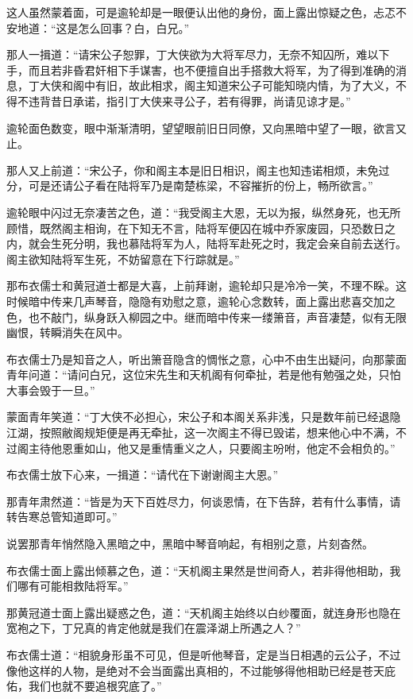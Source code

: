 这人虽然蒙着面，可是逾轮却是一眼便认出他的身份，面上露出惊疑之色，忐忑不安地道：“这是怎么回事？白，白兄。”

那人一揖道：“请宋公子恕罪，丁大侠欲为大将军尽力，无奈不知囚所，难以下手，而且若非昏君奸相下手谋害，也不便擅自出手搭救大将军，为了得到准确的消息，丁大侠和阁中有旧，故此相求，阁主知道宋公子可能知晓内情，为了大义，不得不违背昔日承诺，指引丁大侠来寻公子，若有得罪，尚请见谅才是。”

逾轮面色数变，眼中渐渐清明，望望眼前旧日同僚，又向黑暗中望了一眼，欲言又止。

那人又上前道：“宋公子，你和阁主本是旧日相识，阁主也知违诺相烦，未免过分，可是还请公子看在陆将军乃是南楚栋梁，不容摧折的份上，畅所欲言。”

逾轮眼中闪过无奈凄苦之色，道：“我受阁主大恩，无以为报，纵然身死，也无所顾惜，既然阁主相询，在下知无不言，陆将军便囚在城中乔家废园，只恐数日之内，就会生死分明，我也慕陆将军为人，陆将军赴死之时，我定会亲自前去送行。阁主欲知陆将军生死，不妨留意在下行踪就是。”

那布衣儒士和黄冠道士都是大喜，上前拜谢，逾轮却只是冷冷一笑，不理不睬。这时候暗中传来几声琴音，隐隐有劝慰之意，逾轮心念数转，面上露出悲喜交加之色，也不敲门，纵身跃入柳园之中。继而暗中传来一缕箫音，声音凄楚，似有无限幽恨，转瞬消失在风中。

布衣儒士乃是知音之人，听出箫音隐含的惆怅之意，心中不由生出疑问，向那蒙面青年问道：“请问白兄，这位宋先生和天机阁有何牵扯，若是他有勉强之处，只怕大事会毁于一旦。”

蒙面青年笑道：“丁大侠不必担心，宋公子和本阁关系非浅，只是数年前已经退隐江湖，按照敝阁规矩便是再无牵扯，这一次阁主不得已毁诺，想来他心中不满，不过阁主待他恩重如山，他又是重情重义之人，只要阁主吩咐，他定不会相负的。”

布衣儒士放下心来，一揖道：“请代在下谢谢阁主大恩。”

那青年肃然道：“皆是为天下百姓尽力，何谈恩情，在下告辞，若有什么事情，请转告寒总管知道即可。”

说罢那青年悄然隐入黑暗之中，黑暗中琴音响起，有相别之意，片刻杳然。

布衣儒士面上露出倾慕之色，道：“天机阁主果然是世间奇人，若非得他相助，我们哪有可能相救陆将军。”

那黄冠道士面上露出疑惑之色，道：“天机阁主始终以白纱覆面，就连身形也隐在宽袍之下，丁兄真的肯定他就是我们在震泽湖上所遇之人？”

布衣儒士道：“相貌身形虽不可见，但是听他琴音，定是当日相遇的云公子，不过像他这样的人物，是绝对不会当面露出真相的，不过能够得他相助已经是苍天庇佑，我们也就不要追根究底了。”


